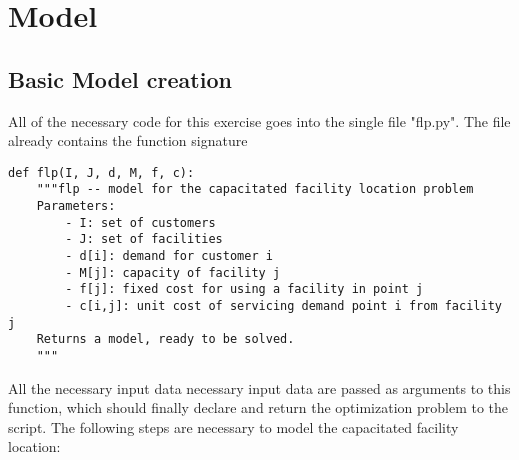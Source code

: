 \documentclass[a4paper,10pt]{article}
\begin{document}
\section{Model}

\subsection{Basic Model creation}

All of the necessary code for this exercise goes into
the single file "flp.py". The file already contains the
function signature

\begin{lstlisting}
def flp(I, J, d, M, f, c):
    """flp -- model for the capacitated facility location problem
    Parameters:
        - I: set of customers
        - J: set of facilities
        - d[i]: demand for customer i
        - M[j]: capacity of facility j
        - f[j]: fixed cost for using a facility in point j
        - c[i,j]: unit cost of servicing demand point i from facility j
    Returns a model, ready to be solved.
    """
\end{lstlisting}

All the necessary input data necessary input data are passed as arguments to this function, which should finally declare and return the optimization problem to the script.
The following steps are necessary to
model the capacitated facility location:
\end{document}
